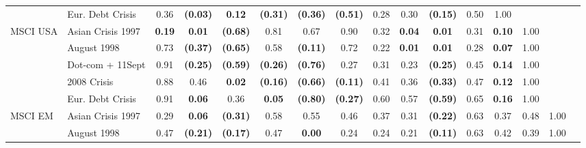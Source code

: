 \documentclass[12pt]{article}
\begin{document}
\begin{table}[H]
{\begin{tabular}{@{}llcccccccccccccc@{}}
                  & Eur. Debt Crisis  & 0.36            & \textbf{(0.03)} & \textbf{0.12}   & \textbf{(0.31)} & \textbf{(0.36)} & \textbf{(0.51)} & 0.28            & 0.30            & \textbf{(0.15)} & 0.50            & 1.00            &                 &                 &                 \\
MSCI USA          & Asian Crisis 1997 & \textbf{0.19}   & \textbf{0.01}   & \textbf{(0.68)} & 0.81            & 0.67            & 0.90            & 0.32            & \textbf{0.04}   & \textbf{0.01}   & 0.31            & \textbf{0.10}   & 1.00            &                 &                 \\
                  & August 1998       & 0.73            & \textbf{(0.37)} & \textbf{(0.65)} & 0.58            & \textbf{(0.11)} & 0.72            & 0.22            & \textbf{0.01}   & \textbf{0.01}   & 0.28            & \textbf{0.07}   & 1.00            &                 &                 \\
                  & Dot-com + 11Sept  & 0.91            & \textbf{(0.25)} & \textbf{(0.59)} & \textbf{(0.26)} & \textbf{(0.76)} & 0.27            & 0.31            & 0.23            & \textbf{(0.25)} & 0.45            & \textbf{0.14}   & 1.00            &                 &                 \\
                  & 2008 Crisis       & 0.88            & 0.46            & \textbf{0.02}   & \textbf{(0.16)} & \textbf{(0.66)} & \textbf{(0.11)} & 0.41            & 0.36            & \textbf{(0.33)} & 0.47            & \textbf{0.12}   & 1.00            &                 &                 \\
                  & Eur. Debt Crisis  & 0.91            & \textbf{0.06}   & 0.36            & \textbf{0.05}   & \textbf{(0.80)} & \textbf{(0.27)} & 0.60            & 0.57            & \textbf{(0.59)} & 0.65            & \textbf{0.16}   & 1.00            &                 &                 \\
MSCI EM           & Asian Crisis 1997 & 0.29            & \textbf{0.06}   & \textbf{(0.31)} & 0.58            & 0.55            & 0.46            & 0.37            & 0.31            & \textbf{(0.22)} & 0.63            & 0.37            & 0.48            & 1.00            &                 \\
                  & August 1998       & 0.47            & \textbf{(0.21)} & \textbf{(0.17)} & 0.47            & \textbf{0.00}   & 0.24            & 0.24            & 0.21            & \textbf{(0.11)} & 0.63            & 0.42            & 0.39            & 1.00            &                 \\

\end{tabular}}
\end{table}
\end{document}
